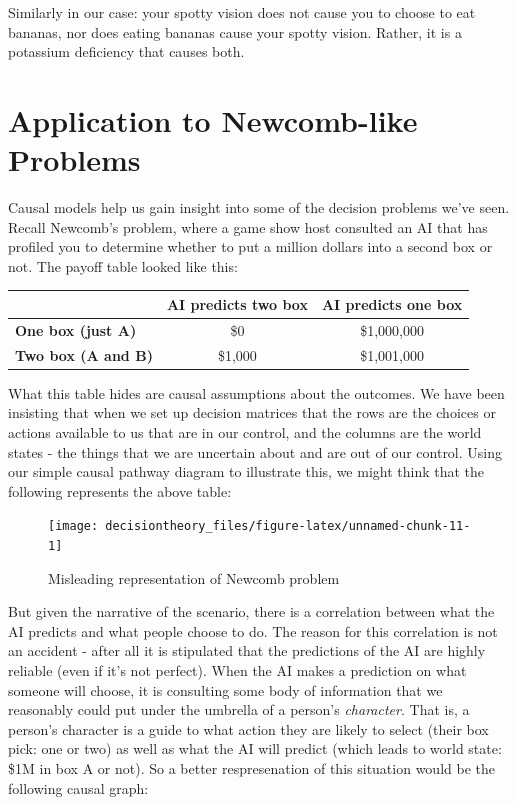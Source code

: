 \documentclass[]{tufte-book}
\begin{document}
Similarly in our case: your spotty vision does not cause you to choose to eat bananas, nor does eating bananas cause your spotty vision. Rather, it is a potassium deficiency that causes both.

\hypertarget{application-to-newcomb-like-problems}{%
\section{Application to Newcomb-like Problems}\label{application-to-newcomb-like-problems}}

Causal models help us gain insight into some of the decision problems we've seen. Recall Newcomb's problem, where a game show host consulted an AI that has profiled you to determine whether to put a million dollars into a second box or not. The payoff table looked like this:

\begin{longtable}[]{@{}lcc@{}}
\toprule
& AI predicts two box & AI predicts one box\tabularnewline
\midrule
\endhead
\textbf{One box (just A)} & \$0 & \$1,000,000\tabularnewline
\textbf{Two box (A and B)} & \$1,000 & \$1,001,000\tabularnewline
\bottomrule
\end{longtable}

What this table hides are causal assumptions about the outcomes. We have been insisting that when we set up decision matrices that the rows are the choices or actions available to us that are in our control, and the columns are the world states - the things that we are uncertain about and are out of our control. Using our simple causal pathway diagram to illustrate this, we might think that the following represents the above table:

\begin{figure}
\texttt{[image: decisiontheory\_files/figure-latex/unnamed-chunk-11-1]} \caption[Misleading representation of Newcomb problem]{Misleading representation of Newcomb problem}\label{fig:unnamed-chunk-11}
\end{figure}

But given the narrative of the scenario, there is a correlation between what the AI predicts and what people choose to do. The reason for this correlation is not an accident - after all it is stipulated that the predictions of the AI are highly reliable (even if it's not perfect). When the AI makes a prediction on what someone will choose, it is consulting some body of information that we reasonably could put under the umbrella of a person's \emph{character}. That is, a person's character is a guide to what action they are likely to select (their box pick: one or two) as well as what the AI will predict (which leads to world state: \$1M in box A or not). So a better respresenation of this situation would be the following causal graph:
\end{document}
